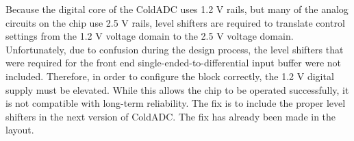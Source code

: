 \label{sec:5.2}


Because the digital core of the ColdADC uses 1.2 V rails, but many of the analog circuits on the chip use 2.5 V rails, level shifters are required to translate control settings from the 1.2 V voltage domain to the 2.5 V voltage domain. Unfortunately, due to confusion during the design process, the level shifters that were required for the front end single-ended-to-differential input buffer were not included. Therefore, in order to configure the block correctly, the 1.2 V digital supply must be elevated. While this allows the chip to be operated successfully, it is not compatible with long-term reliability. The fix is to include the proper level shifters in the next version of ColdADC. The fix has already been made in the layout.

